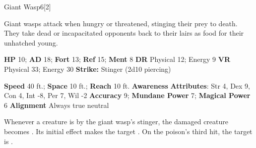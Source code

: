   \begin{monsection}{Giant Wasp}{6}[2]
    \vspace{-1em}\vspace{-1em}
    \vspace{0em}

    
      Giant wasps attack when hungry or threatened, stinging their prey to death.
      They take dead or incapacitated opponents back to their lairs as food for their unhatched young.
    
    

    \begin{spellcontent}
      \begin{spelltargetinginfo}
        \pari \textbf{HP} 10;
          \textbf{AD} 18;
          \textbf{Fort} 13;
          \textbf{Ref} 15;
          \textbf{Ment} 8
        \pari \textbf{DR} Physical 12; Energy 9
        \pari \textbf{VR} Physical 33; Energy 30
        \pari \textbf{Strike:}
            Stinger  (2d10 piercing)
      \end{spelltargetinginfo}
    \end{spellcontent}
    \begin{monsterfooter}
      \pari \textbf{Speed} 40 ft.;
        \textbf{Space} 10 ft.;
        \textbf{Reach} 10 ft.
      \pari \textbf{Awareness} 
      \pari \textbf{Attributes}:
        Str 4, Dex 9,
        Con 4, Int -8,
        Per 7, Wil -2
      \pari \textbf{Accuracy} 9;
        \textbf{Mundane Power} 7;
      \textbf{Magical Power} 6
      \pari \textbf{Alignment} Always true neutral
    \end{monsterfooter}
  \end{monsection}
    Whenever a creature is  by the giant wasp's stinger,
      the damaged creature becomes .
    Its initial effect makes the target .
    On the poison's third hit, the target is .
  
